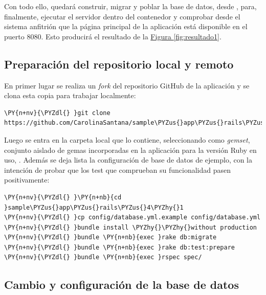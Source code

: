Con todo ello, quedará construir, migrar y poblar la base de datos, desde , para, finalmente, ejecutar el servidor  dentro del contenedor  y comprobar desde el sistema anfitrión que la página principal de la aplicación  está disponible en el puerto 8080. Esto producirá el resultado de la \hyperref[fig:resultado1]{Figura \ref{fig:resultado1}}.

\subsection{Preparación del repositorio local y remoto}

En primer lugar se realiza un \textit{fork} del repositorio GitHub de la aplicación  y se clona esta copia para trabajar localmente:

\begin{framed_shaded}
\begin{Verbatim}[fontsize=\relsize{-2.5},fontseries=b,commandchars=\\\{\}]
\PY{n+nv}{\PYZdl{} }git clone https://github.com/CarolinaSantana/sample\PYZus{}app\PYZus{}rails\PYZus{}4\PYZhy{}1.git 
\end{Verbatim}
\end{framed_shaded}

Luego se entra en la carpeta local que lo contiene, seleccionando como \textit{gemset}, conjunto aislado de gemas incorporadas en la aplicación para la versión Ruby en uso, . Además se deja lista la configuración de base de datos de ejemplo, con la intención de probar que los test que comprueban su funcionalidad pasen positivamente: 

\begin{framed_shaded}
\begin{Verbatim}[fontsize=\relsize{-2.5},fontseries=b,commandchars=\\\{\}]
\PY{n+nv}{\PYZdl{} }\PY{n+nb}{cd }sample\PYZus{}app\PYZus{}rails\PYZus{}4\PYZhy{}1
\PY{n+nv}{\PYZdl{} }cp config/database.yml.example config/database.yml
\PY{n+nv}{\PYZdl{} }bundle install \PYZhy{}\PYZhy{}without production
\PY{n+nv}{\PYZdl{} }bundle \PY{n+nb}{exec }rake db:migrate
\PY{n+nv}{\PYZdl{} }bundle \PY{n+nb}{exec }rake db:test:prepare
\PY{n+nv}{\PYZdl{} }bundle \PY{n+nb}{exec }rspec spec/
\end{Verbatim}
\end{framed_shaded}

\subsection{Cambio y configuración de la base de datos} \label{postgrescredentials}

